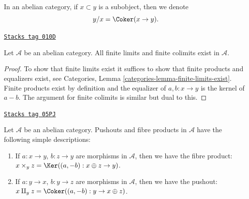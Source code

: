 In an abelian category, if $x \subset y$ is a subobject,
then we denote
$$
y/x = \Coker(x \to y).
$$

\begin{lemma}
\label{homology-lemma-colimit-abelian-category}
\href{https://stacks.math.columbia.edu/tag/010D}{\texttt{Stacks tag 010D}}

Let $\mathcal{A}$ be an abelian category.
All finite limits and finite colimits exist in $\mathcal{A}$.
\end{lemma}

\begin{proof}
To show that finite limits exist it suffices to show
that finite products and equalizers exist, see
Categories, Lemma \ref{categories-lemma-finite-limits-exist}.
Finite products exist
by definition and the equalizer of $a, b : x \to y$ is
the kernel of $a - b$. The argument for finite colimits
is similar but dual to this.
\end{proof}

\begin{example}
\label{homology-example-fibre-product-pushouts}
\href{https://stacks.math.columbia.edu/tag/05PJ}{\texttt{Stacks tag 05PJ}}

Let $\mathcal{A}$ be an abelian category.
Pushouts and fibre products in $\mathcal{A}$ have the following
simple descriptions:
\begin{enumerate}
\item If $a : x \to y$, $b : z \to y$ are morphisms in $\mathcal{A}$, then
we have the fibre product:
$x \times_y z = \Ker((a, -b) : x \oplus z \to y)$.
\item If $a : y \to x$, $b : y \to z$ are morphisms in $\mathcal{A}$, then
we have the pushout:
$x \amalg_y z = \Coker((a, -b) : y \to x \oplus z)$.
\end{enumerate}
\end{example}

